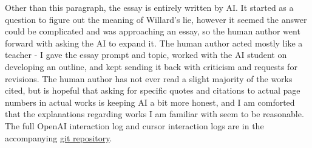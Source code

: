Other than this paragraph, the essay is entirely written by AI.  It started as a question
to figure out the meaning of Willard's lie, however it seemed the answer could be complicated
and was approaching an essay, so the human author went forward with asking the AI to expand
it. The human author acted mostly like a teacher - I gave the essay prompt and topic, worked
with the AI student on developing an outline, and kept sending it back with criticism and
requests for revisions.  The human author has not ever read a slight majority of the works
cited, but is hopeful that asking for specific quotes and citations to actual page numbers
in actual works is keeping AI a bit more honest, and I am comforted that the explanations
regarding works I am familiar with seem to be reasonable.  The full OpenAI interaction log
and cursor interaction logs are in the accompanying
\href{https://github.com/jmalicki/apocalypse-now-essay}{git repository}.
